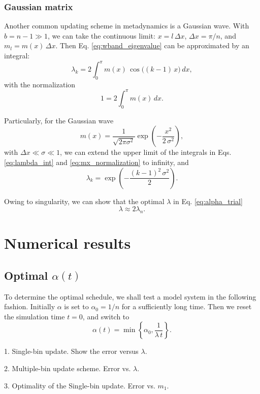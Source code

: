\documentclass[reprint]{revtex4-1}
\begin{document}
\subsubsection{Gaussian matrix}



Another common updating scheme
in metadynamics is a Gaussian wave.
%
With $b = n - 1 \gg 1$,
we can take the continuous limit:
$x = l \, \Delta x$,
$\Delta x = \pi/n$,
and
$m_l = m(x) \, \Delta x$.
%
Then
Eq. \eqref{eq:wband_eigenvalue}
can be approximated by an integral:
%
\begin{equation}
\lambda_k
=
2 \int_0^{\pi}
m(x) \, \cos\bigl((k-1) \, x\bigr) \, dx,
\label{eq:lambda_int}
\end{equation}
%
with the normalization
%
\begin{equation}
1 = 2 \int_0^{\pi} m(x) \, dx.
\label{eq:mx_normalization}
\end{equation}



Particularly, for the Gaussian wave
%
\begin{equation}
m(x) = \frac{1}{\sqrt{2\pi\sigma^2}}
\exp\left( -\frac{ x^2 } { 2 \, \sigma^2 } \right),
\end{equation}
%
with $\Delta x \ll \sigma \ll 1$,
we can extend the upper limit of the integrals
in Eqs. \eqref{eq:lambda_int}
and \eqref{eq:mx_normalization} to infinity,
and
\begin{equation}
\lambda_k = \exp\left(
  -\frac{ (k-1)^2 \, \sigma^2 } { 2 }
\right).
\label{eq:lambda_Gaussian}
\end{equation}

Owing to singularity,
we can show that the optimal $\lambda$
in Eq. \eqref{eq:alpha_trial}
\begin{equation}
  \lambda \approx 2 \lambda_{n}.
\end{equation}


\section{Numerical results}


\subsection{Optimal $\alpha(t)$}


To determine the optimal schedule,
we shall test a model system
in the following fashion.
%
Initially $\alpha$ is set to $\alpha_0 = 1/n$
for a sufficiently long time.
%
Then we reset the simulation time $t = 0$,
and switch to
$$
\alpha(t) = \min\left\{ \alpha_0, \frac{ 1 } { \lambda \, t } \right\}.
$$


1. Single-bin update.
Show the error versus $\lambda$.


2. Multiple-bin update scheme.
Error vs. $\lambda$.

3. Optimality of the Single-bin update.
Error vs. $m_1$.
\end{document}
